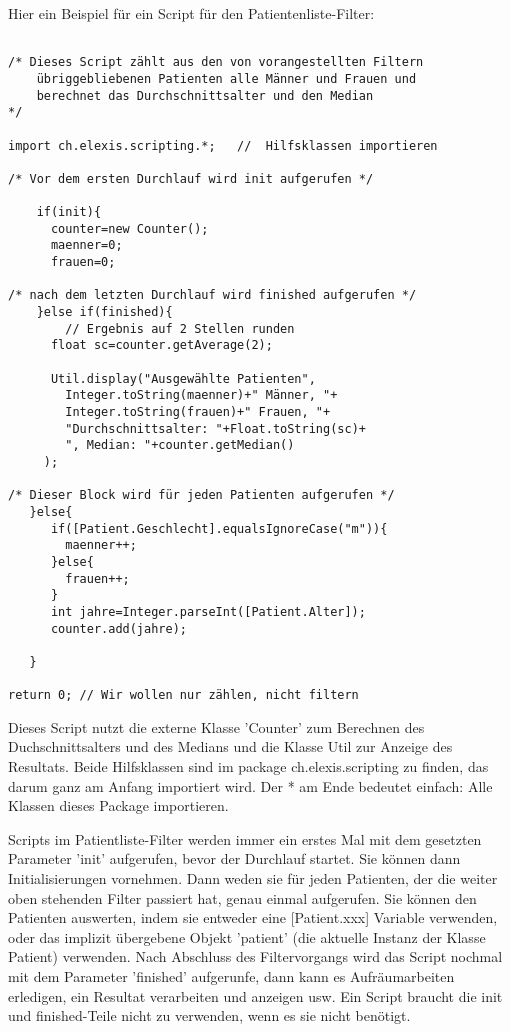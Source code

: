 \documentclass[a4paper]{scrartcl}
\begin{document}
Hier ein Beispiel für ein Script für den Patientenliste-Filter: 
\begin{small}
\begin{verbatim}

/* Dieses Script zählt aus den von vorangestellten Filtern 
    übriggebliebenen Patienten alle Männer und Frauen und 
    berechnet das Durchschnittsalter und den Median 
*/

import ch.elexis.scripting.*;	//  Hilfsklassen importieren

/* Vor dem ersten Durchlauf wird init aufgerufen */

    if(init){					    
      counter=new Counter();				
      maenner=0;					
      frauen=0;

/* nach dem letzten Durchlauf wird finished aufgerufen */
    }else if(finished){				
        // Ergebnis auf 2 Stellen runden
      float sc=counter.getAverage(2);

      Util.display("Ausgewählte Patienten",          
        Integer.toString(maenner)+" Männer, "+
        Integer.toString(frauen)+" Frauen, "+
        "Durchschnittsalter: "+Float.toString(sc)+
        ", Median: "+counter.getMedian()          
     );

/* Dieser Block wird für jeden Patienten aufgerufen */
   }else{
      if([Patient.Geschlecht].equalsIgnoreCase("m")){
        maenner++;
      }else{
        frauen++;
      }
      int jahre=Integer.parseInt([Patient.Alter]);
      counter.add(jahre);

   }

return 0; // Wir wollen nur zählen, nicht filtern

\end{verbatim}
\end{small}

\medskip

Dieses Script nutzt die externe Klasse 'Counter' zum Berechnen des Duchschnittsalters und des Medians und die Klasse Util zur Anzeige des Resultats. Beide Hilfsklassen sind im package ch.elexis.scripting zu finden, das darum ganz am Anfang importiert wird. Der * am Ende bedeutet einfach: Alle Klassen dieses Package importieren. 

\vspace{3mm}

Scripts im Patientliste-Filter werden immer ein erstes Mal mit dem gesetzten Parameter 'init' aufgerufen, bevor der Durchlauf startet. Sie können dann Initialisierungen vornehmen. Dann weden sie für jeden Patienten, der die weiter oben stehenden Filter passiert hat, genau einmal aufgerufen. Sie können den Patienten auswerten, indem sie entweder eine [Patient.xxx] Variable verwenden, oder das implizit übergebene Objekt 'patient' (die aktuelle Instanz der Klasse Patient) verwenden. Nach Abschluss des Filtervorgangs wird das Script nochmal mit dem Parameter 'finished' aufgerunfe, dann kann es Aufräumarbeiten erledigen, ein Resultat verarbeiten und anzeigen usw. Ein Script braucht die init und finished-Teile nicht zu verwenden, wenn es sie nicht benötigt.
\end{document}
